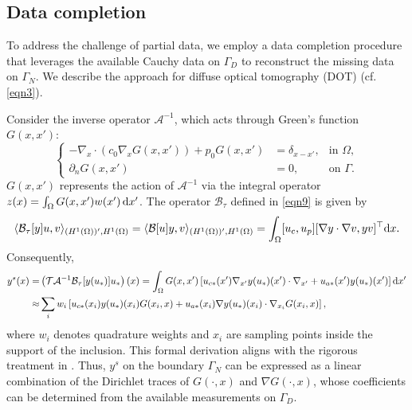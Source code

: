 \documentclass[onefignum,onetabnum]{siamart190516}
\numberwithin{equation}{section}
\begin{document}
\subsection{Data completion}\label{subsec:dc}

To address the challenge of partial data, we employ a data completion procedure that leverages the available Cauchy data on $\Gamma_D$ to reconstruct the missing data on $\Gamma_N$.
We describe the approach for diffuse optical tomography (DOT) (cf. \eqref{eqn3}).

Consider the inverse operator $\mathcal{A}^{-1}$, which acts through Green's function $G(x,x')$:
\begin{equation*}
\left\{
\begin{aligned}
- \nabla_x \cdot \left( c_0 \nabla_x G(x,x') \right) + p_0 G(x,x') &= \delta_{x-x'}, & \text{in } \Omega, \\
\partial_{n}G(x,x') &= 0, & \text{on } \Gamma.
\end{aligned}
\right.
\end{equation*}
$G(x,x')$ represents the action of $\mathcal{A}^{-1}$ via the integral operator $z(x) = \int_{\Omega} G(x,x') w(x') \, {\rm d}x'$.
The operator $\mathcal{B}_\tau$ defined in \eqref{eqn9} is given by
\begin{equation*}
\langle \mathcal{B}_\tau[y]u, v \rangle_{(H^1(\Omega))', H^1(\Omega)} = \langle\mathcal{B}[u]y,v\rangle_{(H^{1}(\Omega))', H^{1}(\Omega)} = \int_{\Omega} [u_{c},u_{p}] [\nabla y \cdot \nabla v , y v]^{\top} {\rm d}x.
\end{equation*}
Consequently,
\begin{equation*}
\begin{aligned}
y^{s}(x) =& \left( \mathcal{T} \mathcal{A}^{-1} \mathcal{B}_\tau[y(u_*)]u_* \right)(x) = \int_{\Omega} G(x,x') \left[ u_{c*}(x') \nabla_{x'} y(u_*)(x') \cdot \nabla_{x'} + u_{a*}(x') y(u_*)(x') \right] {\rm d}x'\\
\approx &\sum_{i} w_{i} \left[ u_{c*}(x_{i}) y(u_*)(x_{i}) G(x_{i},x) + u_{a*}(x_{i}) \nabla y(u_*)(x_{i}) \cdot \nabla_{x_{i}} G(x_{i},x) \right],
\end{aligned}
\end{equation*}
where $w_{i}$ denotes quadrature weights { and $x_{i}$ are sampling points inside the support of the inclusion. This formal derivation aligns with the rigorous treatment in \cite[(3.12)]{Chow2021}.}
Thus, $y^{s}$ on the boundary $\Gamma_{N}$ can be expressed as a linear combination of the Dirichlet traces of $G(\cdot,x)$ and $\nabla G(\cdot,x)$, whose coefficients can be determined from the available measurements on $\Gamma_D$.
\end{document}
